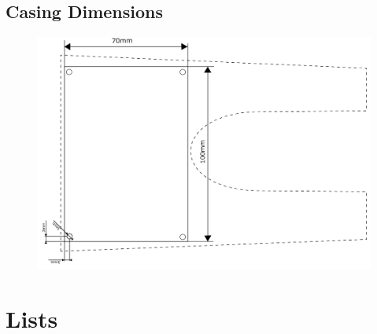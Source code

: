 \clearpage
\subsection{Casing Dimensions}
\begin{figure}[htb]
	\centering
    \includegraphics[height=.8\linewidth, angle = 270]{Figures/casing_dimensions.png}
	\label{fig:casdim}
\end{figure}

\clearpage
\section{Lists}
